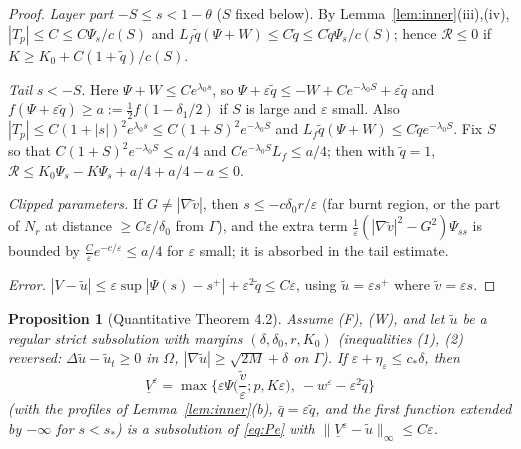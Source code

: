 \documentclass[11pt]{amsart}
\newtheorem{proposition}[theorem]{Proposition}
\theoremstyle{definition}
\theoremstyle{remark}
\newcommand{\ve}{\varepsilon}
\begin{document}
\begin{proof}
\emph{Layer part} $-S\le s<1-\theta$ ($S$ fixed below). By
Lemma~\ref{lem:inner}(iii),(iv), $|T_p|\le C\le C\Psi_s/c(S)$ and
$L_f\tilde q(\Psi+W)\le C\tilde q\le C\tilde q\Psi_s/c(S)$; hence $\mathcal R\le0$ if
$K\ge K_0+C(1+\tilde q)/c(S)$.

\emph{Tail} $s<-S$. Here $\Psi+W\le Ce^{\lambda_0 s}$, so $\Psi+\ve\tilde q\le-W+Ce^{-\lambda_0S}+\ve\tilde q$
and $f(\Psi+\ve\tilde q)\ge a:=\frac12f(1-\delta_1/2)$ if $S$ is large and $\ve$ small.
Also $|T_p|\le C(1+|s|)^2e^{\lambda_0s}\le C(1+S)^2e^{-\lambda_0S}$ and
$L_f\tilde q(\Psi+W)\le C\tilde qe^{-\lambda_0S}$. Fix $S$ so that
$C(1+S)^2e^{-\lambda_0S}\le a/4$ and $Ce^{-\lambda_0S}L_f\le a/4$; then with $\tilde q=1$,
$\mathcal R\le K_0\Psi_s-K\Psi_s+a/4+a/4-a\le0$.

\emph{Clipped parameters.} If $G\ne|\nabla\tilde v|$, then $s\le-c\delta_0 r/\ve$ (far
burnt region, or the part of $N_r$ at distance $\ge C\ve/\delta_0$ from $\Gamma$), and the
extra term $\frac1\ve(|\nabla\tilde v|^2-G^2)\Psi_{ss}$ is bounded by
$\frac C\ve e^{-c/\ve}\le a/4$ for $\ve$ small; it is absorbed in the tail estimate.

\emph{Error.} $|V-\tilde u|\le\ve\sup|\Psi(s)-s^+|+\ve^2\tilde q\le C\ve$, using
$\tilde u=\ve s^+$ where $\tilde v=\ve s$.
\end{proof}

\begin{proposition}[Quantitative Theorem 4.2]\label{prop:sub}
Assume (F), (W), and let $\tilde u$ be a regular strict \emph{subsolution} with
margins $(\delta,\delta_0,r,K_0)$ (inequalities (1), (2) reversed:
$\Delta\tilde u-\tilde u_t\ge0$ in $\Omega$, $|\nabla\tilde u|\ge\sqrt{2M}+\delta$ on
$\Gamma$). If $\ve+\eta_\ve\le c_*\delta$, then
\[
\underline V^\ve=\max\Big\{\ve\Psi\Big(\frac{\tilde v}\ve;p,K\ve\Big),\ -w^\ve-\ve^2\tilde q\Big\}
\]
(with the profiles of Lemma~\ref{lem:inner}(b), $\bar q=\ve\tilde q$, and the first
function extended by $-\infty$ for $s<s_*$) is a subsolution of \eqref{eq:Pe} with
$\|\underline V^\ve-\tilde u\|_\infty\le C\ve$.
\end{proposition}
\end{document}
